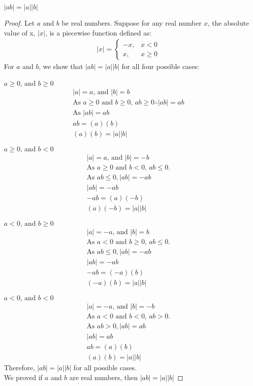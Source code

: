 \documentclass[a4paper,11pt]{article}
\begin{document}
\begin{theorem1}
\( |ab| = |a||b|\)
\begin{proof}
Let \(a\) and \(b\) be real numbers. Suppose for any real number \(x\), the 
absolute value of x, \(|x|\), is a piecewise function defined as:
\begin{align}
  \label{quad}
     |x| = \left\{
     \begin{array}{lr}
       -x, & x < 0\\
        x, & x \geq 0
     \end{array}
   \right.
\end{align}
For \(a\) and \(b\), we show that \(|ab| = |a||b|\) for all four possible 
cases:\\ \\
\(a \geq 0 \text{, and } b \geq 0\)
\begin{gather*}
\label{case1}
|a| = a \text{, and } |b|=b\\
\text{As \(a \geq 0\) and \(b \geq 0\), \(ab \geq 0 \therefore |ab|=ab\)}\\
\text{As }
|ab| = ab\\
ab=(a)(b)\\
(a)(b)=|a||b|
\end{gather*}

\noindent{}\(a \geq 0 \text{, and } b < 0\)
\begin{gather*}
\label{case2}
|a| = a \text{, and } |b|=-b\\
\text{As \(a \geq 0\) and \(b < 0\), \(ab \leq 0\).}\\
\text{As } ab \leq 0, |ab|=-ab\\
|ab|= -ab\\
-ab = (a)(-b)\\
(a)(-b) = |a||b|
\end{gather*}

\noindent{}\(a < 0 \text{, and } b \geq 0\)
\begin{gather*}
\label{case3}
|a| = -a \text{, and } |b|=b\\
\text{As \(a < 0\) and \(b \geq 0\), \(ab \leq 0\).}\\
\text{As } ab \leq 0, |ab|=-ab\\
|ab|= -ab\\
-ab = (-a)(b)\\
(-a)(b) = |a||b|
\end{gather*}

\noindent{}\(a < 0 \text{, and } b < 0\)
\begin{gather*}
\label{case4}
|a| = -a \text{, and } |b|=-b\\
\text{As \(a < 0\) and \(b < 0\), \(ab > 0\).}\\
\text{As } ab > 0, |ab|=ab\\
|ab|= ab\\
ab = (a)(b)\\
(a)(b) = |a||b|
\end{gather*}
Therefore, \(|ab|=|a||b|\) for all possible cases.\\
We proved if \(a\) and \(b\) are real numbers, then \(|ab|=|a||b|\)
\end{proof}
\end{theorem1}
\newpage
\end{document}

